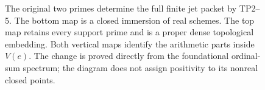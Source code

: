 \begin{figure}[ht]
\centering
{}
\caption{The original two primes determine the full finite jet
packet by TP2--5. The bottom map is a closed immersion of real
schemes. The top map retains every support prime and is a proper
dense topological embedding. Both vertical maps identify the
arithmetic parts inside $V(e)$. The change is proved directly
from the foundational ordinal-sum spectrum; the diagram does not
assign positivity to its nonreal closed points.}
\end{figure}
